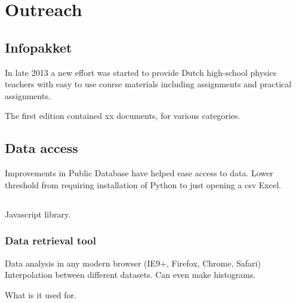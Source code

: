 \chapter{Outreach}
\label{ch:outreach}

\section{Infopakket}

In late 2013 a new effort was started to provide Dutch high-school
physics teachers with easy to use course materials including assignments
and practical assignments.

The first edition contained xx documents, for various categories.


\section{Data access}

Improvements in Public Database have helped ease access to data. Lower
threshold from requiring installation of Python to just opening a csv
Excel.


\section{\jsparc}

Javascript library.


\subsection{Data retrieval tool}

Data analysis in any modern browser (IE9+, Firefox, Chrome, Safari)
Interpolation between different datasets. Can even make histograms.

What is it used for.
